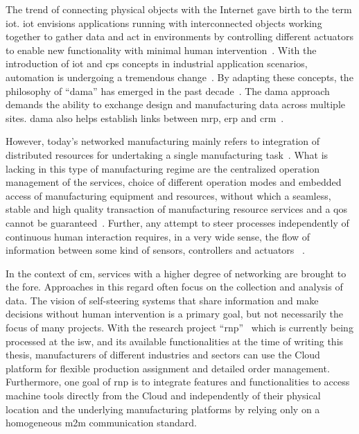 \documentclass[
a4paper,
twoside,
headsepline,
cleardoublepage=empty,
parskip=half,
draft=false
]{scrbook}
\begin{document}
		The trend of connecting physical objects with the Internet gave birth to the term \gls{iot}.
		\gls{iot} envisions applications running with interconnected objects working together to gather data and act in environments by controlling different actuators to enable new functionality with minimal human intervention~\cite{atzori2010internet}.
		With the introduction of \gls{iot} and \gls{cps} concepts in industrial application scenarios, automation is undergoing a tremendous change~\cite{wollschlaeger2017future}.
		By adapting these concepts, the philosophy of ``\gls{dama}'' has emerged in the past decade~\cite{heinrichs2005anywhere,venkatesh2005validating,manenti2011building}.
		The \gls{dama} approach demands the ability to exchange design and manufacturing data across multiple sites.
		\gls{dama} also helps establish links between \gls{mrp}, \gls{erp} and \gls{crm}~\cite{xu2012cloud}.

		However, today's networked manufacturing mainly refers to integration of distributed resources for undertaking a single manufacturing task~\cite{li2010cloud}.
		What is lacking in this type of manufacturing regime are the centralized operation management of the services, choice of different operation modes and embedded access of manufacturing equipment and resources, without which a seamless, stable and high quality transaction of manufacturing resource services and a \gls{qos} cannot be guaranteed~\cite{tao2010theory}.
		Further, any attempt to steer processes independently of continuous human interaction requires, in a very wide sense, the flow of information between some kind of sensors, controllers and actuators ~\cite{sauter2011evolution}.

		In the context of \gls{cm}, services with a higher degree of networking are brought to the fore.
		Approaches in this regard often focus on the collection and analysis of data. The vision of self-steering systems that share information and make decisions without human intervention is a primary goal, but not necessarily the focus of many projects.
		With the research project ``\gls{rnp}''~\cite{ellwein2016} which is currently being processed at the \gls{isw}, and its available functionalities at the time of writing this thesis, manufacturers of different industries and sectors can use the Cloud platform for flexible production assignment and detailed order management.
		Furthermore, one goal of \gls{rnp} is to integrate features and functionalities to access machine tools directly from the Cloud and independently of their physical location and the underlying manufacturing platforms by relying only on a homogeneous \gls{m2m} communication standard.
\end{document}
